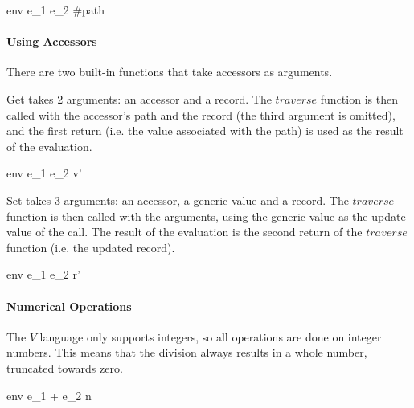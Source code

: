 \documentclass{article}
\begin{document}
    {\mbox{env} \vdash e_1 \; e_2 \Downarrow \#path \; [v_1, \; v_2]}

\paragraph{Using Accessors}

There are two built-in functions that take accessors as arguments.


Get takes 2 arguments: an accessor and a record.
The $traverse$ function is then called with the accessor's path and the record (the third argument is omitted), and the first return (i.e. the value associated with the path) is used as the result of the evaluation.

    {\mbox{env} \vdash e_1 \; e_2 \Downarrow v'}

Set takes 3 arguments: an accessor, a generic value and a record.
The $traverse$ function is then called with the arguments, using the generic value as the update value of the call.
The result of the evaluation is the second return of the $traverse$ function (i.e. the updated record).

    {\mbox{env} \vdash e_1 \; e_2 \Downarrow r'}


\paragraph{Numerical Operations}
The $V$ language only supports integers, so all operations are done on integer numbers.
This means that the division always results in a whole number, truncated towards zero.

\medskip

    {\mbox{env} \vdash e_1 + e_2 \Downarrow n}
\end{document}
